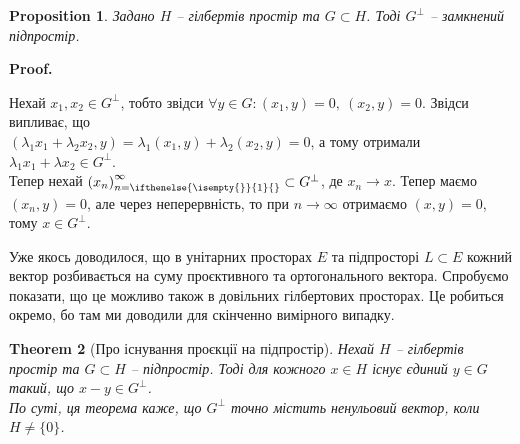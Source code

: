 \documentclass[a4paper, 10pt]{article}
\makeatletter
\theoremstyle{theoremdd}
\newtheorem{theorem}{Theorem}[subsection]
\theoremstyle{theoremdd}
\theoremstyle{theoremdd}
\theoremstyle{theoremdd}
\theoremstyle{theoremdd}
\newtheorem{proposition}[theorem]{Proposition}
\theoremstyle{theoremdd}
\newtheorem{remark}[theorem]{Remark}
\theoremstyle{theoremdd}
\theoremstyle{theoremdd}
\newcommand{\sequence}[2][]{\left({#2}\right)_{n=\ifthenelse{\isempty{#1}}{1}{#1}}^{\infty}}
\renewenvironment{proof}[1][Proof.\\]{\par
\pushQED{\hfill \qed}%
\normalfont \topsep6\p@\@plus6\p@\relax
\trivlist
\item\relax
{\bfseries
#1\@addpunct{.}}\hspace\labelsep\ignorespaces
}{%
\popQED\endtrivlist\@endpefalse
}
\DeclareMathOperator{\linspan}{span}
\makeatother
\begin{document}
\begin{proposition}
Задано $H$ -- гілбертів простір та $G \subset H$. Тоді $G^\perp$ -- замкнений підпростір.
\end{proposition}

\begin{proof}
Нехай $x_1,x_2 \in G^\perp$, тобто звідси $\forall y \in G: (x_1,y) = 0,\ (x_2,y) = 0$. Звідси випливає, що\\
$(\lambda_1 x_1 + \lambda_2 x_2, y) = \lambda_1 (x_1, y) + \lambda_2 (x_2,y) = 0$, а тому отримали $\lambda_1 x_1 + \lambda x_2 \in G^\perp$.\\
Тепер нехай $\sequence{x_n} \subset G^\perp$, де $x_n \to x$. Тепер маємо $(x_n,y) = 0$, але через неперервність, то при $n \to \infty$ отримаємо $(x,y) = 0$, тому $x \in G^\perp$.
\end{proof}

\iffalse %
\begin{proposition}
Задано $H$ -- гілбертів простір та $G \subset H$. Тоді $(G^\perp)^\perp = \overline{\linspan(G)}$.
\end{proposition}

\begin{remark}
Якщо $G \subset H$ та підпростір, то $(G^\perp)^\perp = G$. Якщо брати довільну $G \subset H$, то тоді $(G^\perp)^\perp = \overline{\linspan(G)}$.
\end{remark}
\fi
\noindent
Уже якось доводилося, що в унітарних просторах $E$ та підпросторі $L \subset E$ кожний вектор розбивається на суму проєктивного та ортогонального вектора. Спробуємо показати, що це можливо також в довільних гілбертових просторах. Це робиться окремо, бо там ми доводили для скінченно вимірного випадку.

\begin{theorem}[Про існування проєкції на підпростір]
Нехай $H$ -- гілбертів простір та $G \subset H$ -- підпростір. Тоді для кожного $x \in H$ існує єдиний $y \in G$ такий, що $x-y \in G^{\perp}$.\\
\textit{По суті, ця теорема каже, що $G^\perp$ точно містить ненульовий вектор, коли $H \neq \{0\}$.}
\end{theorem}
\end{document}
